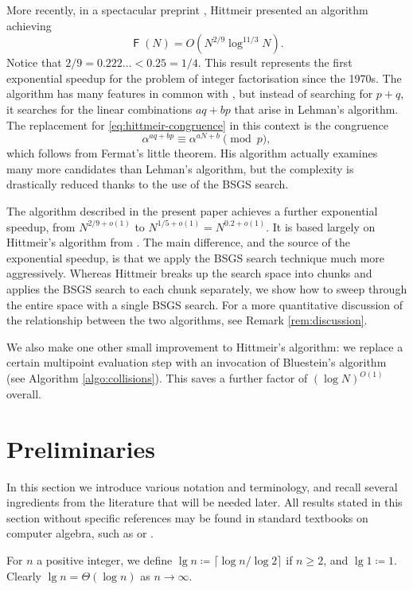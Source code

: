 \documentclass[reqno]{amsart}
\theoremstyle{remark}
\numberwithin{equation}{section}
\numberwithin{thm}{section}
\DeclareMathOperator{\FF}{\mathsf{F}}
\renewcommand{\geq}{\geqslant}
\newcommand{\defeq}{\coloneqq}
\begin{document}
More recently, in a spectacular preprint \cite{Hit-timespace},
Hittmeir presented an algorithm achieving
  \[ \FF(N) = O(N^{2/9} \log^{11/3} N). \]
Notice that $2/9 = 0.222\ldots < 0.25 = 1/4$.
This result represents the first exponential speedup for the problem of
integer factorisation since the 1970s.
The algorithm has many features in common with \cite{Hit-BSGS},
but instead of searching for $p+q$,
it searches for the linear combinations $aq + bp$
that arise in Lehman's algorithm.
The replacement for \eqref{eq:hittmeir-congruence} in this context
is the congruence
  \[ \alpha^{aq + bp} \equiv \alpha^{aN + b} \pmod p, \]
which follows from Fermat's little theorem.
His algorithm actually examines many more candidates than Lehman's algorithm,
but the complexity is drastically reduced thanks to the use of the BSGS search.

The algorithm described in the present paper achieves a further exponential
speedup, from $N^{2/9+o(1)}$ to $N^{1/5+o(1)} = N^{0.2+o(1)}$.
It is based largely on Hittmeir's algorithm from \cite{Hit-timespace}.
The main difference, and the source of the exponential speedup,
is that we apply the BSGS search technique much more aggressively.
Whereas Hittmeir breaks up the search space into chunks and
applies the BSGS search to each chunk separately,
we show how to sweep through the entire space with a single BSGS search.
For a more quantitative discussion of the
relationship between the two algorithms,
see Remark \ref{rem:discussion}.

We also make one other small improvement to Hittmeir's algorithm:
we replace a certain multipoint evaluation step with an invocation of
Bluestein's algorithm \cite{Blu-dft} (see Algorithm \ref{algo:collisions}).
This saves a further factor of $(\log N)^{O(1)}$ overall.



\section{Preliminaries}

In this section we introduce various notation and terminology,
and recall several ingredients from the literature that will be needed later.
All results stated in this section without specific references may be found
in standard textbooks on computer algebra, such as
\cite{vzGG-compalg3} or \cite{BZ-mca}.

For $n$ a positive integer, we define
$\lg n \defeq \lceil \log n / \log 2 \rceil$ if $n \geq 2$,
and $\lg 1 \defeq 1$.
Clearly $\lg n = \Theta(\log n)$ as $n \to \infty$.
\end{document}
